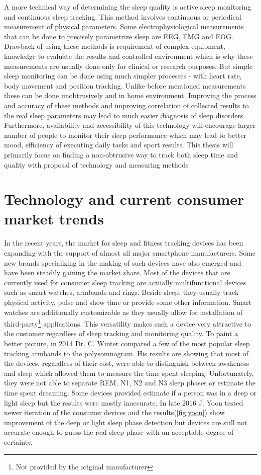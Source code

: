 A more technical way of determining the sleep quality is active sleep monitoring and continuous sleep tracking. This method involves continuous or periodical measurement of physical parameters. Some electrophysiological measurements that can be done to precisely parametrize sleep are \ac{EEG}, \ac{EMG} and \ac{EOG}. Drawback of using these methods is requirement of complex equipment, knowledge to evaluate the results and controlled environment which is why these measurements are usually done only for clinical or research purposes. But simple sleep monitoring can be done using much simpler processes - with heart rate, body movement and position tracking. Unlike before mentioned measurements these can be done unobtrusively and in home environment. Improving the process and accuracy of these methods and improving correlation of collected results to the real sleep parameters may lead to much easier diagnosis of sleep disorders. Furthermore, availability and accessibility of this technology will encourage larger number of people to monitor their sleep performance which may lead to better mood, efficiency of executing daily tasks and sport results. This thesis will primarily focus on finding a non-obtrusive way to track both sleep time and quality with proposal of technology and measuring methods


\section{Technology and current consumer market trends}

In the recent years, the market for sleep and fitness tracking devices has been expanding with the support of almost all major smartphone manufacturers. Some new brands specializing in the making of such devices have also emerged and have been steadily gaining the market share. Most of the devices that are currently used for consumer sleep tracking are actually multifunctional devices such as smart watches, armbands and rings. Beside sleep, they usually track physical activity, pulse and show time or provide some other information. Smart watches are additionally customizable as they usually allow for installation of third-party\footnote{Not provided by the original manufacturer} applications. This versatility makes such a device very attractive to the customer regardless of sleep tracking and monitoring quality. To paint a better picture, in 2014 Dr. C. Winter compared a few of the most popular sleep tracking armbands to the polysomnogram\cite{Winter}. His results are showing that most of the devices, regardless of their cost, were able to distinguish between awakeness and sleep which allowed them to measure the time spent sleeping. Unfortunately, they were not able to separate REM, N1, N2 and N3 sleep phases or estimate the time spent dreaming. Some devices provided estimate if a person was in a deep or light sleep but the results were mostly inaccurate. In late 2016 J. Yoon tested newer iteration of the consumer devices and the results(\ref{fig:yoon}) show improvement of the deep or light sleep phase detection but devices are still not accurate enough to guess the real sleep phase with an acceptable degree of certainty\cite{Yoon}.



